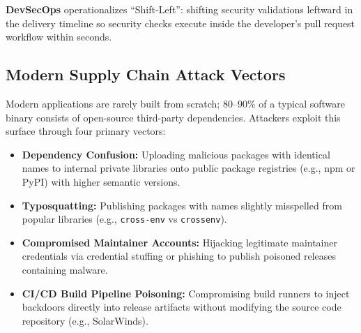 \textbf{DevSecOps} operationalizes ``Shift-Left'': shifting security validations leftward in the delivery timeline so security checks execute inside the developer's pull request workflow within seconds.

\subsection{Modern Supply Chain Attack Vectors}
Modern applications are rarely built from scratch; 80--90\% of a typical software binary consists of open-source third-party dependencies. Attackers exploit this surface through four primary vectors:
\begin{itemize}[leftmargin=12pt]
  \item \textbf{Dependency Confusion:} Uploading malicious packages with identical names to internal private libraries onto public package registries (e.g., npm or PyPI) with higher semantic versions.
  \item \textbf{Typosquatting:} Publishing packages with names slightly misspelled from popular libraries (e.g., \texttt{cross-env} vs \texttt{crossenv}).
  \item \textbf{Compromised Maintainer Accounts:} Hijacking legitimate maintainer credentials via credential stuffing or phishing to publish poisoned releases containing malware.
  \item \textbf{CI/CD Build Pipeline Poisoning:} Compromising build runners to inject backdoors directly into release artifacts without modifying the source code repository (e.g., SolarWinds).
\end{itemize}

